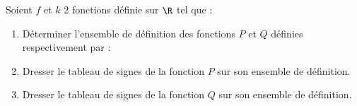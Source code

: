 \begin{exo}{}
		Soient $f$ et $k$ 2 fonctions définie sur $\R$ tel que :
		\begin{enumerate}
			\item Déterminer l'ensemble de définition des fonctions ${P}$ et ${Q}$ définies respectivement par : 
			\item Dresser le tableau de signes de la fonction ${P}$ sur son ensemble de définition.
			\item Dresser le tableau de signes de la fonction ${Q}$ sur son ensemble de définition.
		\end{enumerate}
	\end{exo}
